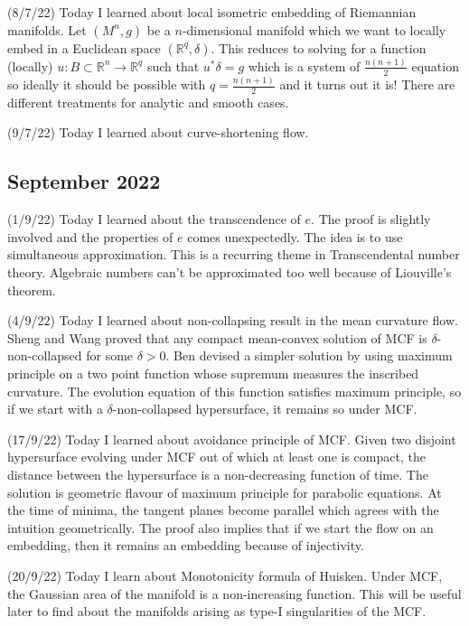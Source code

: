 \documentclass[12pt,a4paper]{article}
\newcommand{\R}{\mathbb{R}}
\begin{document}
(8/7/22) Today I learned about local isometric embedding of Riemannian manifolds. Let $(M^n,g)$ be a $n$-dimensional manifold which we want to locally embed in a Euclidean space $(\R^q,\delta)$. This reduces to solving for a function (locally) $u :B\subset\R^n \to \R^q$ such that $u^*\delta = g$ which is a system of $\frac{n(n+1)}{2}$ equation so ideally it should be possible with $q = \frac{n(n+1)}{2}$ and it turns out it is! There are different treatments for analytic and smooth cases. 
	
(9/7/22) Today I learned about curve-shortening flow.
	
\subsection*{September 2022}

	
\quad (1/9/22) Today I learned about the transcendence of $e$. The proof is slightly involved and the properties of $e$ comes unexpectedly. The idea is to use simultaneous approximation. This is a recurring theme in Transcendental number theory. Algebraic numbers can't be approximated too well because of Liouville's theorem. 
	
(4/9/22) Today I learned about non-collapsing result in the mean curvature flow. Sheng and Wang proved that any compact mean-convex solution of MCF is $\delta$-non-collapsed for some $\delta >0$. Ben devised a simpler solution by using maximum principle on a two point function whose supremum measures the inscribed curvature. The evolution equation of this function satisfies maximum principle, so if we start with a $\delta$-non-collapsed hypersurface, it remains so under MCF.
	
(17/9/22) Today I learned about avoidance principle of MCF. Given two disjoint hypersurface evolving under MCF out of which at least one is compact, the distance between the hypersurface is a non-decreasing function of time. The solution is geometric flavour of maximum principle for parabolic equations. At the time of minima, the tangent planes become parallel which agrees with the intuition geometrically. The proof also implies that if we start the flow on an embedding, then it remains an embedding because of injectivity.
	
(20/9/22) Today I learn about Monotonicity formula of Huisken. Under MCF, the Gaussian area of the manifold is a non-increasing function. This will be useful later to find about the manifolds arising as type-I singularities of the MCF.
	
\end{document}
